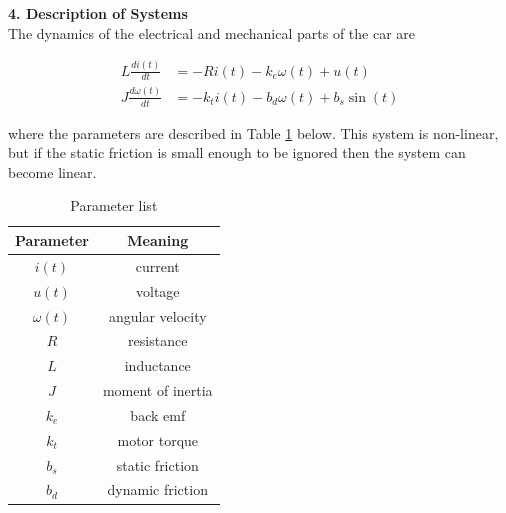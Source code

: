 \documentclass[12pt]{article}
\begin{document}

%

\textbf{4. Description of Systems}\\

The dynamics of the electrical and mechanical parts of the car are

\begin{align}
  L \frac{di(t)}{dt} &= -R i(t) -k_e \omega (t) + u(t) \\
  J \frac{d\omega(t)}{dt} &= -k_t i(t) -b_d \omega (t) + b_s \sin(t)
\end{align}

\noindent where the parameters are described in Table \ref{table:parameters}
below. This system is non-linear, but if the static friction is small enough to
be ignored then the system can become linear.\\

\begin{table}[]
\centering
\caption{Parameter list}
\label{table:parameters}
\begin{tabular}{|c|c|}
 \hline
 \textbf{Parameter} & \textbf{Meaning} \\ \hline
 $i(t)$ & current \\ \hline
 $u(t)$ & voltage \\ \hline
 $\omega(t)$ & angular velocity \\ \hline
 $R$ & resistance \\  \hline
 $L$ & inductance \\ \hline
 $J$ & moment of inertia \\ \hline
 $k_e$ & back emf \\ \hline
 $k_t$ & motor torque \\ \hline
 $b_s$ & static friction \\ \hline
 $b_d$ & dynamic friction \\ \hline
\end{tabular}
\end{table}
\end{document}
